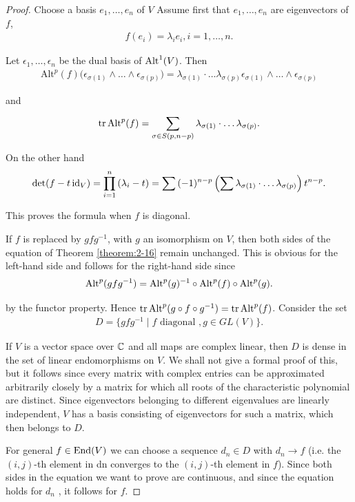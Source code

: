 \begin{proof}
Choose a basis $e_1, \ldots, e_n$ of $V$ Assume first that $e_1, \ldots, e_n$ are eigenvectors of $f$,
\begin{align*}
  f(e_i) = \lambda_i e_i, i = 1, \ldots, n.
\end{align*}

Let $\epsilon_1, \ldots, \epsilon_n$ be the dual basis of $\operatorname{Alt}^1(V)$. Then
\begin{align*}
  \mathrm{Alt}^p(f)\big(\epsilon_{\sigma(1)}\wedge\ldots\wedge\epsilon_{\sigma(p)}\big)
  = \lambda_{\sigma(1)}\cdot\ldots\lambda_{\sigma(p)}\epsilon_{\sigma(1)}\wedge\ldots\wedge\epsilon_{\sigma(p)}
\end{align*}

and 
\begin{align*}
  \operatorname{tr} \operatorname{Alt}^p(f) = \sum_{\sigma\in S(p, n-p)}^{}{\lambda_{\sigma(1)}\cdot\ldots\lambda_{\sigma(p)}}.
\end{align*}

On the other hand
\begin{align*}
  \det(f-t\operatorname{id}_V) 
  = \prod_{i=1}^{n}{(\lambda_i-t)} 
  = \sum{(-1)^{n-p}\left(\sum{\lambda_{\sigma(1)}\cdot\ldots\lambda_{\sigma(p)}}\right)t^{n-p}}.
\end{align*}

This proves the formula when $f$ is diagonal.

If $f$ is replaced by $gfg^{-1}$, with $g$ an isomorphism on $V$, then both sides of the
equation of Theorem \ref{theorem:2-16} remain unchanged. This is obvious for the left-hand
side and follows for the right-hand side since
\begin{align*}
  \operatorname{Alt}^p(gfg^{-1}) = \operatorname{Alt}^p(g)^{-1}\circ\operatorname{Alt}^p(f)\circ\operatorname{Alt}^p(g).
\end{align*}

by the functor property. Hence $\operatorname{tr}\operatorname{Alt}^p(g\circ f\circ g^{-1}) = \operatorname{tr}\operatorname{Alt}^p(f)$. Consider the
set
\begin{align*}
  D = \{gfg^{-1} \mid f \text{ diagonal }, g \in GL(V)\}.
\end{align*}

If $V$ is a vector space over $\mathbb{C}$ and all maps are complex linear, then $D$ is dense
in the set of linear endomorphisms on $V$. We shall not give a formal proof of
this, but it follows since every matrix with complex entries can be approximated
arbitrarily closely by a matrix for which all roots of the characteristic polynomial
are distinct. Since eigenvectors belonging to different eigenvalues are linearly
independent, $V$ has a basis consisting of eigenvectors for such a matrix, which
then belongs to $D$.

For general $f\in\mathrm{End}(V)$ we can choose a sequence $d_n\in D$ with $d_n\to f$ 
(i.e. the $(i, j)$-th element in dn converges to the $(i, j)$-th element in $f$). 
Since both sides in the equation we want to prove are continuous, and since the 
equation holds for $d_n$ , it follows for $f$.
\end{proof}


